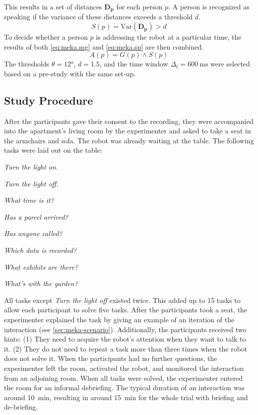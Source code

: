 This results in a set of distances \(\mathbf{D_p}\) for each person \(p\).
A person is recognized as speaking if the variance of these distances exceeds a threshold \(d\).
\begin{equation}\label{eq:meka.sp}
    S(p) = \text{Var}(\mathbf{D_p}) > d
\end{equation}
To decide whether a person \(p\) is addressing the \gls{robot} at a particular time, the results of both \cref{eq:meka.mg} and \cref{eq:meka.sp} are then combined.
\begin{equation}\label{eq:meka.ad}
    A(p) = G(p) \land S(p)
\end{equation}
The thresholds \(\theta = \ang{12}\), \(d=1.5\), and the time window \(\Delta_t=\SI{600}{\ms}\) were selected based on a pre-study with the same set-up.

\subsection{Study Procedure}

After the participants gave their consent to the recording, they were accompanied into the \gls{apartment}'s living room by the experimenter and asked to take a seat in the armchairs and sofa.
The \gls{robot} was already waiting at the table.
The following tasks were laid out on the table:
\begin{enumerate*}[label=(\roman*)]
    \item \emph{Turn the light on.}
    \item \emph{Turn the light off.}
    \item \emph{What time is it?}
    \item \emph{Has a parcel arrived?}
    \item \emph{Has anyone called?}
    \item \emph{Which data is recorded?}
    \item \emph{What exhibits are there?}
    \item \emph{What's with the garden?}
\end{enumerate*}
All tasks except \emph{Turn the light off} existed twice. 
This added up to 15 tasks to allow each participant to solve five tasks.
After the participants took a seat, the experimenter explained the task by giving an example of an iteration of the interaction (see \cref{sec:meka-scenario}).
Additionally, the participants received two hints:
(1) They need to acquire the \gls{robot}'s attention when they want to talk to it.
(2) They do not need to repeat a task more than three times when the \gls{robot} does not solve it.
When the participants had no further questions, the experimenter left the room, activated the \gls{robot}, and monitored the interaction from an adjoining room.
When all tasks were solved, the experimenter entered the room for an informal debriefing.
The typical duration of an interaction was around \SI{10}{min}, resulting in around \SI{15}{min} for the whole trial with briefing and de-briefing.

